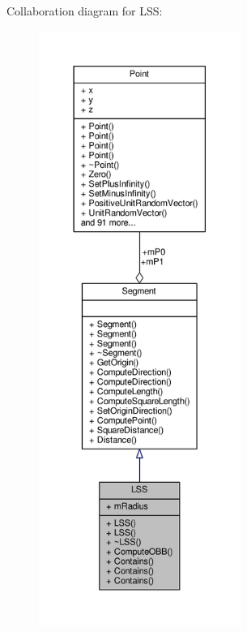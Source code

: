 Collaboration diagram for L\+SS\+:
\nopagebreak
\begin{figure}[H]
\begin{center}
\leavevmode
\includegraphics[height=550pt]{d1/dfa/classLSS__coll__graph}
\end{center}
\end{figure}
